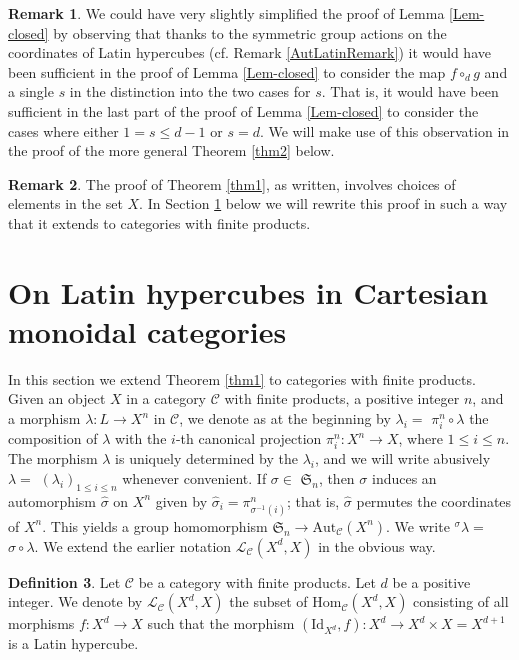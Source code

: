 \documentclass{amsart} %
\theoremstyle{plain}\newtheorem{Theorem}{Theorem}[section]
\theoremstyle{plain}\newtheorem{Conjecture}[Theorem]{Conjecture}
\theoremstyle{plain}\newtheorem{Corollary}[Theorem]{Corollary}
\theoremstyle{plain}\newtheorem{Lemma}[Theorem]{Lemma}
\theoremstyle{plain}\newtheorem{Proposition}[Theorem]{Proposition}
\theoremstyle{definition}\newtheorem{Definition}[Theorem]{Definition}
\theoremstyle{definition}\newtheorem{Example}[Theorem]{Example}
\theoremstyle{definition}\newtheorem{Examples}[Theorem]{Examples}
\theoremstyle{definition}\newtheorem{Remark}[Theorem]{Remark}
\theoremstyle{definition}\newtheorem{Remarks}[Theorem]{Remarks}
\theoremstyle{plain}\newtheorem{Statement}[Theorem]{}
\def\CC{{\mathcal{C}}}    \def\OP{{\mathcal{O}P}}
\def\CL{{\mathcal{L}}}  \def\bCL{{\mathbf{L}}}
\def\Aut{\mathrm{Aut}}   \def\bAut{\mathbf{Aut}}        \def\tenk{\otimes_k}
\def\Hom{\mathrm{Hom}}           \def\tenkS{\otimes_{kS}}
\def\Id{\mathrm{Id}}             \def\tenA{\otimes_A}
\def\sym{\mathfrak{S}} %
\begin{document}
\begin{Remark} \label{rem1} 
We could have very slightly simplified the proof of Lemma \ref{Lem-closed}
by observing that thanks to the symmetric group actions on the coordinates 
of  Latin hypercubes  (cf. Remark \ref{AutLatinRemark}) it would have been 
sufficient in the proof of Lemma \ref{Lem-closed}  to consider the map 
$f\circ_{d} g$ and a single $s$ in the  distinction into the  two cases  for $s$.  
That is,  it would have been sufficient in the last part of the proof of 
Lemma \ref{Lem-closed}  to consider the cases where  either $1=s\leq d-1$ or 
$s=d$.  We will make use of this observation in the proof of the more general 
Theorem \ref{thm2} below.
\end{Remark}

\begin{Remark} \label{rem2}
The proof of Theorem \ref{thm1}, as written, involves choices of  elements in the 
set $X$.  In Section \ref{monoidalSection} below we will rewrite this proof in such 
a way that it extends to categories with finite products. 
 \end{Remark}
 



\section{On Latin hypercubes in  Cartesian  monoidal categories} \label{monoidalSection} 

In this section we extend Theorem \ref{thm1} to categories with finite products.
Given an object $X$ in a category $\CC$ with finite products, 
a positive integer $n$, and a morphism $\lambda : L \to X^n$ in $\CC$, we denote
as at the beginning  by $\lambda_i=$ $\pi^n_i\circ\lambda$ the composition of 
$\lambda$ with the $i$-th canonical projection $\pi^n_i : X^n\to X$, 
where $1\leq i\leq n$. The morphism $\lambda$ is
uniquely determined by the $\lambda_i$, and we will write abusively $\lambda=$
$(\lambda_i)_{1\leq i\leq n}$ whenever convenient. 
If $\sigma\in$ $\sym_n$, then $\sigma$ induces an automorphism $\hat\sigma$ 
on $X^n$ given by $\hat\sigma_i=\pi^n_{\sigma^{-1}(i)}$; that is, $\hat\sigma$ 
permutes the coordinates of $X^n$. This yields a group
homomorphism $\sym_n \to \Aut_\CC(X^n)$.  We write ${^\sigma{\lambda}}=$ 
$\hat\sigma\circ\lambda$. 
 We extend the earlier notation 
$\CL_\CC(X^d,X)$ in the obvious way.

\begin{Definition} \label{CL-DEF}
Let $\CC$ be a category with finite products.
Let $d$ be a positive integer.
We denote by $\CL_\CC(X^d,X)$ the subset of $\Hom_\CC(X^d,X)$
consisting of all morphisms $f : X^d\to X$ such that
the morphism $(\Id_{X^d}, f) : X^d \to X^d\times X = X^{d+1}$ is a Latin hypercube.
\end{Definition}
\end{document}
